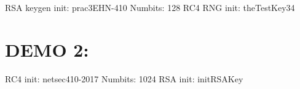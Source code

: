 R\+SA keygen init\+: prac3\+E\+H\+N-\/410 Numbits\+: 128 R\+C4 R\+NG init\+: the\+Test\+Key34

\section*{D\+E\+MO 2\+: }

R\+C4 init\+: netsec410-\/2017 Numbits\+: 1024 R\+SA init\+: init\+R\+S\+A\+Key 
